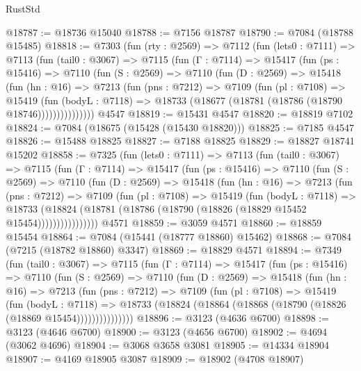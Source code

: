 \begin{lexlean}{RustStd}
\begin{coremodule}
@18787 := @18736 @15040
@18788 := @7156 @18787
@18790 := @7084 (@18788 @15485)
@18818 := @7303
    (fun (rty : @2569) =>
    @7112
      (fun (lets0 : @7111) =>
      @7113
        (fun (tail0 : @3067) =>
        @7115
          (fun (Γ : @7114) =>
          @15417
            (fun (ps : @15416) =>
            @7110
              (fun (S : @2569) =>
              @7110
                (fun (D : @2569) =>
                @15418
                  (fun (hn : @16) =>
                  @7213
                    (fun (pns : @7212) =>
                    @7109
                      (fun (pl : @7108) =>
                      @15419
                        (fun (bodyL : @7118) =>
                        @18733 (@18677 (@18781 (@18786 (@18790 @18746)))))))))))))))
    @4547
@18819 := @15431 @4547
@18820 := @18819 @7102
@18824 := @7084 (@18675 (@15428 (@15430 @18820)))
@18825 := @7185 @4547
@18826 := @15488 @18825
@18827 := @7188 @18825
@18829 := @18827 @18741 @15202
@18858 := @7325
    (fun (lets0 : @7111) =>
    @7113
      (fun (tail0 : @3067) =>
      @7115
        (fun (Γ : @7114) =>
        @15417
          (fun (ps : @15416) =>
          @7110
            (fun (S : @2569) =>
            @7110
              (fun (D : @2569) =>
              @15418
                (fun (hn : @16) =>
                @7213
                  (fun (pns : @7212) =>
                  @7109
                    (fun (pl : @7108) =>
                    @15419
                      (fun (bodyL : @7118) =>
                      @18733
                        (@18824
                          (@18781 (@18786 (@18790 (@18826 (@18829 @15452 @15454))))))))))))))))
    @4571
@18859 := @3059 @4571
@18860 := @18859 @15454
@18864 := @7084 (@15441 (@18777 @18860) @15462)
@18868 := @7084 (@7215 (@18782 @18860) @3347)
@18869 := @18829 @4571
@18894 := @7349
    (fun (tail0 : @3067) =>
    @7115
      (fun (Γ : @7114) =>
      @15417
        (fun (ps : @15416) =>
        @7110
          (fun (S : @2569) =>
          @7110
            (fun (D : @2569) =>
            @15418
              (fun (hn : @16) =>
              @7213
                (fun (pns : @7212) =>
                @7109
                  (fun (pl : @7108) =>
                  @15419
                    (fun (bodyL : @7118) =>
                    @18733 (@18824 (@18864 (@18868 (@18790 (@18826 (@18869 @15454)))))))))))))))
@18896 := @3123 (@4636 @6700)
@18898 := @3123 (@4646 @6700)
@18900 := @3123 (@4656 @6700)
@18902 := @4694 (@3062 @4696)
@18904 := @3068 @3658 @3081
@18905 := @14334 @18904
@18907 := @4169 @18905 @3087
@18909 := @18902 (@4708 @18907)

\end{coremodule}
\end{lexlean}
